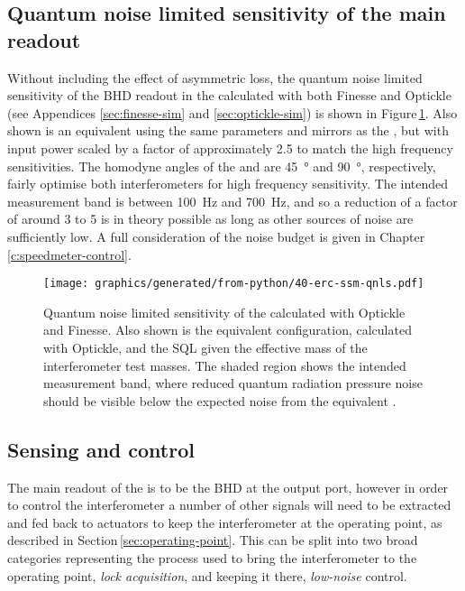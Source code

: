 \subsection{Quantum noise limited sensitivity of the main readout}
Without including the effect of asymmetric loss, the quantum noise limited sensitivity of the \gls{BHD} readout in the \SSMEXPT{} calculated with both Finesse and Optickle (see Appendices \ref{sec:finesse-sim} and \ref{sec:optickle-sim}) is shown in Figure\,\ref{fig:erc-ssm-qnls}. Also shown is an equivalent \MI{} using the same parameters and mirrors as the \SSM{}, but with input power scaled by a factor of approximately \num{2.5} to match the high frequency sensitivities. The homodyne angles of the \SSM{} and \MI{} are \SI{45}{\degree} and \SI{90}{\degree}, respectively, fairly optimise both interferometers for high frequency sensitivity. The intended measurement band is between \SI{100}{\hertz} and \SI{700}{\hertz}, and so a reduction of a factor of around \num{3} to \num{5} is in theory possible as long as other sources of noise are sufficiently low. A full consideration of the noise budget is given in Chapter\,\ref{c:speedmeter-control}.

\begin{figure}
  \centering
  \texttt{[image: graphics/generated/from-python/40-erc-ssm-qnls.pdf]}
  \caption[Quantum noise limited sensitivity of the \SSMEXPT{}]{\label{fig:erc-ssm-qnls}Quantum noise limited sensitivity of the \SSMEXPT{} calculated with Optickle and Finesse. Also shown is the equivalent \MI{} configuration, calculated with Optickle, and the \gls{SQL} given the effective mass of the interferometer test masses. The shaded  region shows the intended measurement band, where reduced quantum radiation pressure noise should be visible below the expected noise from the equivalent \MI{}.}
\end{figure}

\subsection{Sensing and control}
The main readout of the \SSMEXPT{} is to be the \gls{BHD} at the output port, however in order to control the interferometer a number of other signals will need to be extracted and fed back to actuators to keep the interferometer at the operating point, as described in Section\,\ref{sec:operating-point}. This can be split into two broad categories representing the process used to bring the interferometer to the operating point, \emph{lock acquisition}, and keeping it there, \emph{low-noise} control.

